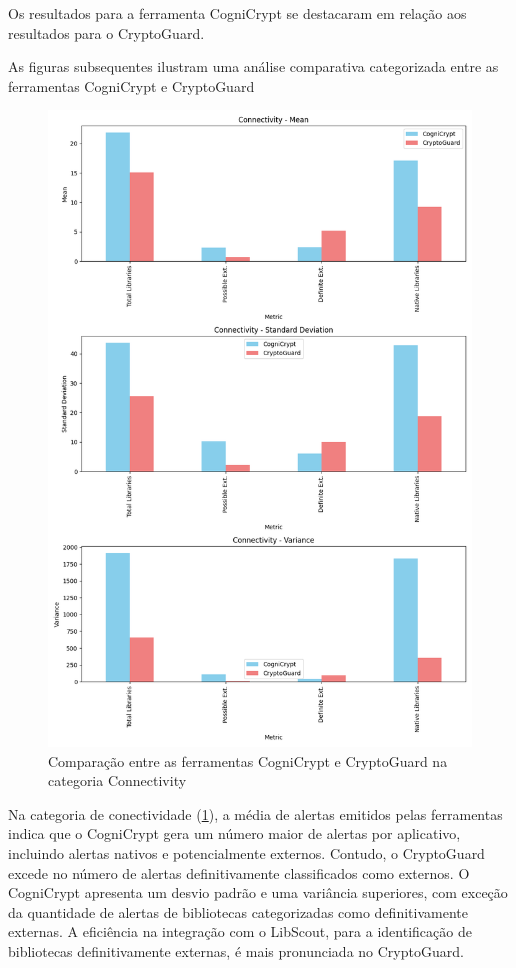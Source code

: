 \FloatBarrier

Os resultados para a ferramenta CogniCrypt se destacaram em relação aos resultados para o CryptoGuard. 

As figuras subsequentes ilustram uma análise comparativa categorizada entre as ferramentas CogniCrypt e CryptoGuard

\begin{figure}[!ht]
  \centering
  \includegraphics[scale=0.5]{img/plot_cc_x_cg_connectivity.png}
  \caption{Comparação entre as ferramentas CogniCrypt e CryptoGuard na categoria Connectivity}
  \label{img: CCvsCG_Connectivity}
\end{figure}

\FloatBarrier

Na categoria de conectividade (\ref{img: CCvsCG_Connectivity}), a média de alertas emitidos pelas ferramentas indica que o CogniCrypt gera um número maior de alertas por aplicativo, incluindo alertas nativos e potencialmente externos. Contudo, o CryptoGuard excede no número de alertas definitivamente classificados como externos.
O CogniCrypt apresenta um desvio padrão e uma variância superiores, com exceção da quantidade de alertas de bibliotecas categorizadas como definitivamente externas.
A eficiência na integração com o LibScout, para a identificação de bibliotecas definitivamente externas, é mais pronunciada no CryptoGuard.


